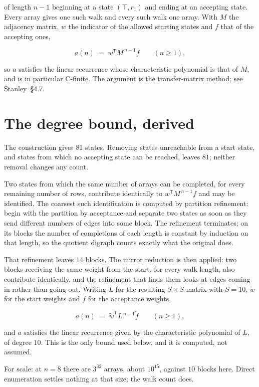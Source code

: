 \documentclass[11pt]{article}
\theoremstyle{definition}
\begin{document}
of length $n-1$ beginning at a state $(\top,r_1)$ and ending at an accepting state. Every array gives one such walk and every such walk one array. With $M$ the adjacency matrix, $w$ the indicator of the allowed starting states and $f$ that of the accepting ones,

\[a(n) \;=\; w^{\mathsf T} M^{\,n-1} f \qquad (n \ge 1),\]

so $a$ satisfies the linear recurrence whose characteristic polynomial is that of $M$, and is in particular C-finite. The argument is the transfer-matrix method; see Stanley~\S4.7.

\section{The degree bound, derived}

The construction gives $81$ states. Removing states unreachable from a start state, and states from which no accepting state can be reached, leaves $81$; neither removal changes any count.

Two states from which the same number of arrays can be completed, for every remaining number of rows, contribute identically to $w^{\mathsf T}M^{\,n-1}f$ and may be identified. The coarsest such identification is computed by partition refinement: begin with the partition by acceptance and separate two states as soon as they send different numbers of edges into some block. The refinement terminates; on its blocks the number of completions of each length is constant by induction on that length, so the quotient digraph counts exactly what the original does.

That refinement leaves $14$ blocks. The mirror reduction is then applied: two blocks receiving the same weight from the start, for every walk length, also contribute identically, and the refinement that finds them looks at edges coming in rather than going out. Writing $L$ for the resulting $S \times S$ matrix with $S = 10$, $\tilde w$ for the start weights and $\tilde f$ for the acceptance weights,

\[a(n) \;=\; \tilde w^{\mathsf T} L^{\,n-1} \tilde f \qquad (n \ge 1),\]

and $a$ satisfies the linear recurrence given by the characteristic polynomial of $L$, of degree $10$. This is the only bound used below, and it is computed, not assumed.

For scale: at $n = 8$ there are $3^{32}$ arrays, about $10^{15}$, against $10$ blocks here. Direct enumeration settles nothing at that size; the walk count does.
\end{document}
